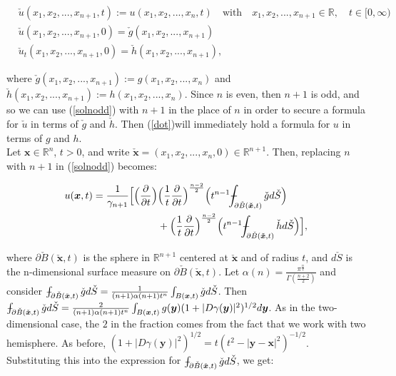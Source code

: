 \documentclass[a4paper, 12pt]{article}
\def\Xint#1{\mathchoice
{\XXint\displaystyle\textstyle{#1}}%
{\XXint\textstyle\scriptstyle{#1}}%
{\XXint\scriptstyle\scriptscriptstyle{#1}}%
{\XXint\scriptscriptstyle\scriptscriptstyle{#1}}%
\!\int}
\def\XXint#1#2#3{{\setbox0=\hbox{$#1{#2#3}{\int}$ }
\vcenter{\hbox{$#2#3$ }}\kern-.6\wd0}}
\def\dashint{\Xint-}
\numberwithin{equation}{section}
\begin{document}
\begin{equation} \label{dot}
    \begin{aligned}
        &\check{u}(x_1, x_2, ..., x_{n+1}, t):=u(x_1, x_2, ..., x_n, t) \quad \textrm{with} \quad x_1, x_2, ..., x_{n+1} \in \mathbb{R}, \quad t \in [0, \infty)\\
        &\check{u}(x_1, x_2, ..., x_{n+1}, 0)=\check{g}(x_1, x_2, ..., x_{n+1})\\
        &\check{u}_t(x_1, x_2, ..., x_{n+1}, 0)=\check{h}(x_1, x_2, ..., x_{n+1}),
    \end{aligned}
\end{equation}

where $\check{g}(x_1, x_2, ..., x_{n+1}):=g(x_1, x_2, ..., x_n)$ and
$\check{h}(x_1, x_2, ..., x_{n+1}):=h(x_1, x_2, ..., x_n)$. Since $n$ is even,
then $n+1$ is odd, and so we can use (\ref{solnodd}) with $n+1$ in the place of
$n$ in order to secure a formula for $\check{u}$ in terms of $\check{g}$ and
$\check{h}$. Then (\ref{dot})will immediately hold a formula for $u$ in terms of
$g$ and $h$. 
\\

Let $\boldsymbol{x} \in \mathbb{R}^n$, $t>0$, and write
$\check{\boldsymbol{x}}=(x_1, x_2, ..., x_n, 0) \in \mathbb{R}^{n+1}$. Then,
replacing $n$ with $n+1$ in (\ref{solnodd}) becomes:

\begin{equation} \label{solneven}
    \begin{split}
        u(\boldsymbol{x}, t)=\frac{1}{\gamma_{n+1}}\Big[\Big(\diffp[1]{}{t}\Big) & \Big(\frac{1}{t} \diffp[1]{}{t} \Big)^{\frac{n-2}{2}}\Big(t^{n-1} \dashint_{\partial \check{B}(\boldsymbol{\check{x}},t)}\check{g}d\check{S} \Big)\\
        &+ \Big(\frac{1}{t} \diffp[1]{}{t} \Big)^{\frac{n-2}{2}}\Big(t^{n-1} \dashint_{\partial \check{B}(\boldsymbol{\check{x}},t)}\check{h}d\check{S} \Big)\Big],
    \end{split}
\end{equation} 

 where $\partial \check{B}(\boldsymbol{\check{x}},t)$ is the sphere in
 $\mathbb{R}^{n+1}$ centered at $\boldsymbol{\check{x}}$ and of radius $t$, and
 $d\check{S}$ is the n-dimensional surface measure on $\partial
 \check{B}(\boldsymbol{\check{x}},t)$. Let
 $\alpha(n)=\frac{\pi^{\frac{n}{2}}}{\Gamma(\frac{n+2}{2})}$ and consider
 $\dashint_{\partial \check{B}(\check{\boldsymbol{x}}, t)}
 \check{g}d\check{S}=\frac{1}{(n+1)\alpha(n+1)t^n}\int_{B(\boldsymbol{x},t)}\check{g}d\check{S}$.
 Then $\dashint_{\partial \check{B}(\check{\boldsymbol{x}}, t)}
 \check{g}d\check{S}=\frac{2}{(n+1)\alpha(n+1)t^n}\int_{B(\boldsymbol{x},t)}g(\boldsymbol{y})(1+|D\gamma(\boldsymbol{y})|^2)^{1/2}d\boldsymbol{y}$.
 As in the two-dimensional case, the $2$ in the fraction comes from the fact
 that we work with two hemisphere. As before, $(1+|D\gamma
 (\boldsymbol{y})|^2)^{1/2}=t(t^2-|\boldsymbol{y}-\boldsymbol{x}|^2)^{-1/2}$.
 Substituting this into the expression for $\dashint_{\partial
 \check{B}(\check{\boldsymbol{x}}, t)} \check{g}d\check{S}$, we get:
\end{document}
